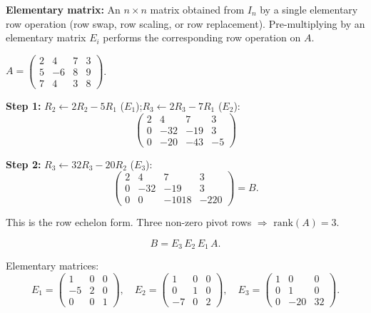 \documentclass[12pt,a3paper]{article}
\begin{document}
\begin{tcolorbox}[enhanced,breakable,colback=cB!4,colframe=cB,
  boxrule=0.8pt,arc=5pt,
  title={\textbf{Answer --- Elementary Matrix Sequence to Echelon Form}},
  fonttitle=\bfseries\color{white},colbacktitle=cB]

\textbf{Elementary matrix:} An $n\times n$ matrix obtained from $I_n$ by a single elementary
row operation (row swap, row scaling, or row replacement). Pre-multiplying by an
elementary matrix $E_i$ performs the corresponding row operation on $A$.

\medskip
$A=\begin{pmatrix}2&4&7&3\\5&-6&8&9\\7&4&3&8\end{pmatrix}$.

\textbf{Step 1:} $R_2\leftarrow 2R_2-5R_1$ ($E_1$);\quad $R_3\leftarrow 2R_3-7R_1$ ($E_2$):
\[
\begin{pmatrix}2&4&7&3\\0&-32&-19&3\\0&-20&-43&-5\end{pmatrix}
\]

\textbf{Step 2:} $R_3\leftarrow 32R_3-20R_2$ ($E_3$):
\[
\begin{pmatrix}2&4&7&3\\0&-32&-19&3\\0&0&-1018&-220\end{pmatrix}
=B.
\]

This is the row echelon form. Three non-zero pivot rows $\Rightarrow$ $\mathrm{rank}(A)=3$.

\[
B = E_3\,E_2\,E_1\,A.
\]

Elementary matrices:
\[
E_1=\begin{pmatrix}1&0&0\\-5&2&0\\0&0&1\end{pmatrix},\quad
E_2=\begin{pmatrix}1&0&0\\0&1&0\\-7&0&2\end{pmatrix},\quad
E_3=\begin{pmatrix}1&0&0\\0&1&0\\0&-20&32\end{pmatrix}.
\]

\end{tcolorbox}
\end{document}

